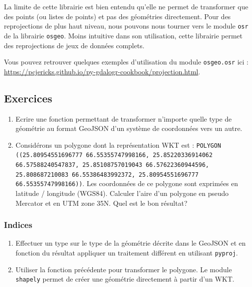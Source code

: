 \documentclass[11pt]{article}
\newcommand{\passthrough}[1]{#1}
\def\tightlist{}
\begin{document}
La limite de cette librairie est bien entendu qu'elle ne permet de
transformer que des points (ou listes de points) et pas des géométries
directement. Pour des reprojections de plus haut niveau, nous pouvons
nous tourner vers le module \passthrough{\lstinline!osr!} de la
librairie \passthrough{\lstinline!osgeo!}. Moins intuitive dans son
utilisation, cette librairie permet des reprojections de jeux de données
complets.

Vous pouvez retrouver quelques exemples d'utilisation du module
\passthrough{\lstinline!osgeo.osr!} ici :
\url{https://pcjericks.github.io/py-gdalogr-cookbook/projection.html}.

\hypertarget{exercices-2}{%
\subsection{Exercices}\label{exercices-2}}

\begin{enumerate}
\def\labelenumi{\arabic{enumi}.}
\tightlist
\item
  Ecrire une fonction permettant de transformer n'importe quelle type de
  géométrie au format GeoJSON d'un système de coordonnées vers un autre.
\item
  Considérons un polygone dont la représentation WKT est :
  \passthrough{\lstinline!POLYGON ((25.80954551696777 66.55355747998166, 25.85220336914062 66.57588240547837, 25.85108757019043 66.57622360944596, 25.808687210083 66.55386483992372, 25.80954551696777 66.55355747998166))!}.
  Les coordonnées de ce polygone sont exprimées en latitude / longitude
  (WGS84). Calculer l'aire d'un polygone en pseudo Mercator et en UTM
  zone 35N. Quel est le bon résultat?
\end{enumerate}

\hypertarget{indices-2}{%
\subsubsection{Indices}\label{indices-2}}

\begin{enumerate}
\def\labelenumi{\arabic{enumi}.}
\tightlist
\item
  Effectuer un type sur le type de la géométrie décrite dans le GeoJSON
  et en fonction du résultat appliquer un traitement différent en
  utilisant \passthrough{\lstinline!pyproj!}.
\item
  Utiliser la fonction précédente pour transformer le polygone. Le
  module \passthrough{\lstinline!shapely!} permet de créer une géométrie
  directement à partir d'un WKT.
\end{enumerate}
\end{document}
